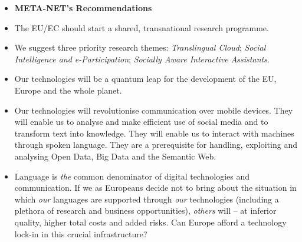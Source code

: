 \documentclass[10pt, plain]{../../metanetpaper}
\begin{document}
\begin{multicols}{2}
\begin{itemize}
  \item[] \textbf{META-NET's Recommendations}
  \item The EU/EC should start a shared, transnational research programme. \smallskip
  \item We suggest three priority research themes: \emph{Translingual Cloud}; \emph{Social Intelligence and e-Participation}; \emph{Socially Aware Interactive Assistants}.\smallskip
  \item Our technologies will be a quantum leap for the development of the EU, Europe and the whole planet.\smallskip
  \item Our technologies will revolutionise communication over mobile devices. They will enable us to analyse and make efficient use of social media and to transform text into knowledge. They will enable us to interact with machines through spoken language. They are a prerequisite for handling, exploiting and analysing Open Data, Big Data and the Semantic Web.\smallskip
  \item Language is \emph{the} common denominator of digital technologies and communication. If we as Europeans decide not to bring about the situation in which \emph{our} languages are supported through \emph{our} technologies (including a plethora of research and business opportunities), \emph{others} will -- at inferior quality, higher total costs and added risks. Can Europe afford a technology lock-in in this crucial infrastructure?
  \end{itemize}
\end{multicols}
\vspace*{-5mm}


\end{document}
